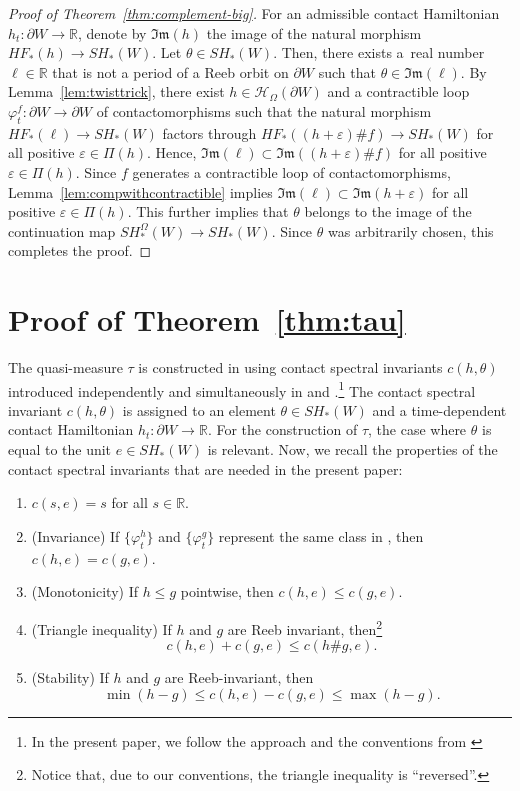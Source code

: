 \documentclass[pdftex]{sigma}
\numberwithin{equation}{section}
\theoremstyle{definition}
\begin{document}
\begin{proof}[Proof of Theorem~\ref{thm:complement-big}]
For an admissible contact Hamiltonian $h_t\colon \partial W\to\mathbb{R}$, denote by $\mathfrak{Im}(h)$ the image of the natural morphism $HF_\ast(h)\to SH_\ast(W)$. Let $\theta\in SH_\ast(W)$. Then, there exists a~real number $\ell\in \mathbb{R}$ that is not a period of a Reeb orbit on $\partial W$ such that $\theta\in\mathfrak{Im}(\ell)$. By Lemma~\ref{lem:twisttrick}, there exist $h\in\mathcal{H}_\Omega(\partial W)$ and a contractible loop $\varphi^f_t\colon \partial W\to\partial W$ of contactomorphisms such that the natural morphism $HF_\ast(\ell)\to SH_\ast(W)$ factors through $HF_\ast((h+\varepsilon)\#f)\to SH_\ast(W)$ for all positive $\varepsilon \in \Pi(h)$. Hence, $\mathfrak{Im}(\ell)\subset \mathfrak{Im}((h+\varepsilon)\# f)$ for all positive $\varepsilon \in \Pi(h)$. Since $f$ generates a contractible loop of contactomorphisms, Lemma~\ref{lem:compwithcontractible} implies $\mathfrak{Im}(\ell)\subset \mathfrak{Im}(h+\varepsilon)$ for all positive $\varepsilon \in \Pi(h)$. This further implies that $\theta$ belongs to the image of the continuation map $SH_\ast^\Omega(W)\to SH_\ast(W)$. Since $\theta$ was arbitrarily chosen, this completes the proof.
\end{proof}


\section{Proof of Theorem~\ref{thm:tau}}\label{sec:tau}

The quasi-measure $\tau$ is constructed in \cite{djordjevic2025quantitative} using contact spectral invariants $c(h, \theta)$ introduced independently and simultaneously in \cite{cant2023shelukhin} and \cite{djordjevic2023quantitative}.\footnote{In the present paper, we follow the approach and the conventions from \cite{djordjevic2025quantitative}} The contact spectral invariant $c(h, \theta)$ is assigned to an element $\theta\in SH_\ast(W)$ and a time-dependent contact Hamiltonian $h_t\colon \partial W\to \mathbb{R}$. {For} the construction of $\tau$, the case where $\theta$ is equal to the unit $e\in SH_\ast(W)$ is relevant.
Now, we recall the properties of the contact spectral invariants that are needed in the present paper:
\begin{enumerate}\itemsep=0pt
\item[(1)] $c(s, e)= s$ for all $s\in \mathbb{R}$.
\item[(2)] ({Invariance}) If $\bigl\{\varphi^h_t\bigr\}$ and $ \{\varphi_t^g \}$ represent the same class in , then $c(h,e)= c(g, e)$.
\item[(3)] (Monotonicity) If $h\leqslant g$ pointwise, then ${c(h, e)\leqslant c(g, e)}$.
\item[(4)] (Triangle inequality) If $h$ and $g$ are Reeb invariant, then\footnote{Notice that, due to our conventions, the triangle inequality is ``reversed''.}
\[
c(h, e) + c(g, e)\leqslant c(h\#g, e).
\]
\item[(5)] (Stability) If $h$ and $g$ are Reeb-invariant, then
\[ \min (h-g)\leqslant c(h,e) - c(g, e)\leqslant \max(h-g). \]
\end{enumerate}
\end{document}
